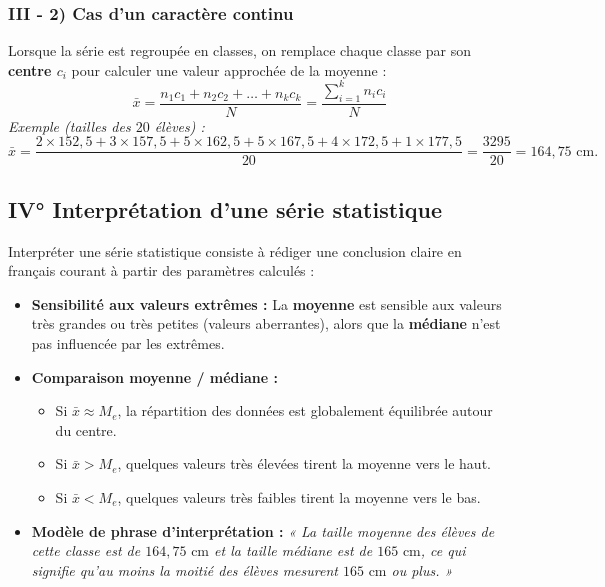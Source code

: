 \documentclass[11pt, a4paper]{article}
\begin{document}
\subsubsection*{III - 2) Cas d'un caractère continu}
Lorsque la série est regroupée en classes, on remplace chaque classe par son \textbf{centre $c_i$} pour calculer une valeur approchée de la moyenne :
\[
    \bar{x} = \frac{n_1 c_1 + n_2 c_2 + \dots + n_k c_k}{N} = \frac{\sum_{i=1}^{k} n_i c_i}{N}
\]
\textit{Exemple (tailles des $20$ élèves) :}
\[
    \bar{x} = \frac{2 \times 152,5 + 3 \times 157,5 + 5 \times 162,5 + 5 \times 167,5 + 4 \times 172,5 + 1 \times 177,5}{20} = \frac{3295}{20} = 164,75\text{ cm}.
\]

\subsection*{\textcolor{primary}{IV° Interprétation d'une série statistique}}

Interpréter une série statistique consiste à rédiger une conclusion claire en français courant à partir des paramètres calculés :
\begin{itemize}
    \item \textbf{Sensibilité aux valeurs extrêmes :} La \textbf{moyenne} est sensible aux valeurs très grandes ou très petites (valeurs aberrantes), alors que la \textbf{médiane} n'est pas influencée par les extrêmes.
    \item \textbf{Comparaison moyenne / médiane :}
    \begin{itemize}
        \item Si $\bar{x} \approx M_e$, la répartition des données est globalement équilibrée autour du centre.
        \item Si $\bar{x} > M_e$, quelques valeurs très élevées tirent la moyenne vers le haut.
        \item Si $\bar{x} < M_e$, quelques valeurs très faibles tirent la moyenne vers le bas.
    \end{itemize}
    \item \textbf{Modèle de phrase d'interprétation :} \textit{« La taille moyenne des élèves de cette classe est de $164,75\text{ cm}$ et la taille médiane est de $165\text{ cm}$, ce qui signifie qu'au moins la moitié des élèves mesurent $165\text{ cm}$ ou plus. »}
\end{itemize}
\end{document}
